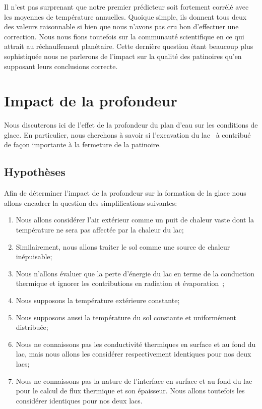 \documentclass[12pt]{article}
\numberwithin{figure}{section}
\numberwithin{table}{section}
\begin{document}
Il n'est pas surprenant que notre premier pr\'edicteur soit fortement corr\'el\'e avec les moyennes
de temp\'erature annuelles. Quoique simple, ils donnent tous deux des valeurs raisonnable si bien
que nous n'avons pas cru bon d'effectuer une correction. Nous nous fions toutefois sur la
communaut\'e scientifique en ce qui attrait au r\'echauffement plan\'etaire. Cette derni\`ere
question \'etant beaucoup plus sophistiqu\'ee nous ne parlerons de l'impact sur la qualit\'e des
patinoires qu'en supposant leurs conclusions correcte.

\section{Impact de la profondeur}

Nous discuterons ici de l'effet de la profondeur du plan d'eau sur les conditions de glace. En
particulier, nous cherchons \`a savoir si l'excavation du lac~\cite{Lac} \`a contribu\'e de fa\c con
importante \`a la fermeture de la patinoire.

\subsection{Hypoth\`eses}

Afin de d\'eterminer l'impact de la profondeur sur la formation de la glace nous allons encadrer la
question des simplifications suivantes:

\begin{enumerate}
    \item Nous allons consid\'erer l'air ext\'erieur comme un puit de chaleur vaste dont la
        temp\'erature ne sera pas affect\'ee par la chaleur du lac;
    \item Similairement, nous allons traiter le sol comme une source de chaleur in\'epuisable;
    \item Nous n'allons \'evaluer que la perte d'\'energie du lac en terme de la conduction thermique
        et ignorer les contributions en radiation et \'evaporation~\cite{Evap};
    \item Nous supposons la temp\'erature ext\'erieure constante;
    \item Nous supposons aussi la temp\'erature du sol constante et uniform\'ement distribu\'ee;
    \item Nous ne connaissons pas les conductivit\'e thermiques en surface et au fond du lac, mais
        nous allons les consid\'erer respectivement identiques pour nos deux lacs;
    \item Nous ne connaissons pas la nature de l'interface en surface et au fond du lac pour le
        calcul de flux thermique et son \'epaisseur. Nous allons toutefois les consid\'erer
        identiques pour nos deux lacs.
\end{enumerate}
\end{document}
